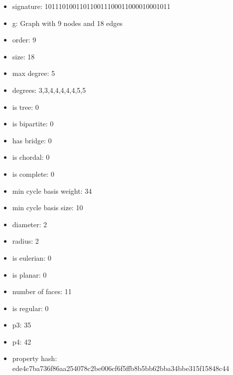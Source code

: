 \newpage
\begin{figure}
\end{figure}
\begin{itemize}
\item signature: 101110100110110011100011000010001011
\item g: Graph with 9 nodes and 18 edges
\item order: 9
\item size: 18
\item max degree: 5
\item degrees: 3,3,4,4,4,4,4,5,5
\item is tree: 0
\item is bipartite: 0
\item has bridge: 0
\item is chordal: 0
\item is complete: 0
\item min cycle basis weight: 34
\item min cycle basis size: 10
\item diameter: 2
\item radius: 2
\item is eulerian: 0
\item is planar: 0
\item number of faces: 11
\item is regular: 0
\item p3: 35
\item p4: 42
\item property hash: ede4c7ba736f86aa254078c2be006cf6f5ffb8b5bb62bba34bbe315f15848c44
\end{itemize}

